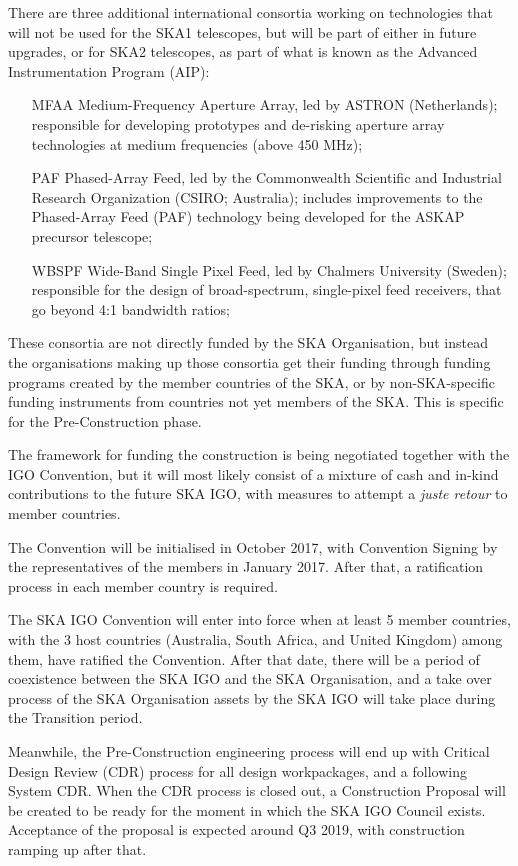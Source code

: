 \documentclass[a4paper,
               biblatex,       %
               keeplastbox,    %
               ]{jacow-2_1}    %
\begin{document}
There are three additional international consortia working on technologies that will not be used for the SKA1 telescopes, but will be part of either in future upgrades, or for SKA2 telescopes, as part of what is known as the Advanced Instrumentation Program (AIP):

\begin{itemize}
	\item[MFAA] Medium-Frequency Aperture Array, led by ASTRON (Netherlands); responsible for developing prototypes and de-risking aperture array technologies at medium frequencies (above 450 MHz);
	\item[PAF] Phased-Array Feed, led by the Commonwealth Scientific and Industrial Research Organization (CSIRO; Australia); includes improvements to the Phased-Array Feed (PAF) technology being developed for the ASKAP precursor telescope;
	\item[WBSPF] Wide-Band Single Pixel Feed, led by Chalmers University (Sweden); responsible for the design of broad-spectrum, single-pixel feed receivers, that go beyond 4:1 bandwidth ratios;
\end{itemize}

These consortia are not directly funded by the SKA Organisation, but instead the organisations making up those consortia get their funding through funding programs created by the member countries of the SKA, or by non-SKA-specific  funding instruments from countries not yet members of the SKA. This is specific for the Pre-Construction phase.

The framework for funding the construction is being negotiated together with the IGO Convention, but it will most likely consist of a mixture of cash and in-kind contributions to the future SKA IGO, with measures to attempt a \emph{juste retour} to member countries.

The Convention will be initialised in October 2017, with Convention Signing by the representatives of the members in January 2017. After that, a ratification process in each member country is required.

The SKA IGO Convention will enter into force when at least 5 member countries, with the 3 host countries (Australia, South Africa, and United Kingdom) among them, have ratified the Convention. After that date, there will be a period of coexistence between the SKA IGO and the SKA Organisation, and a take over process of the SKA Organisation assets by the SKA IGO will take place during the Transition period.

Meanwhile, the Pre-Construction engineering process will end up with Critical Design Review (CDR) process for all design workpackages, and a following System CDR. When the CDR process is closed out, a Construction Proposal will be created to be ready for the moment in which the SKA IGO Council exists. Acceptance of the proposal is expected around Q3 2019, with construction ramping up after that.
\end{document}

